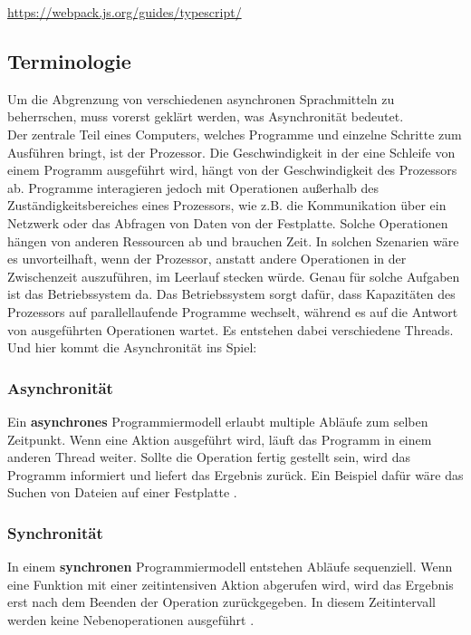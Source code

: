 \begin{center}
\url{https://webpack.js.org/guides/typescript/} 
\end{center}

\subsection{Terminologie}

Um die Abgrenzung von verschiedenen asynchronen Sprachmitteln zu beherrschen, muss vorerst geklärt werden, was Asynchronität bedeutet.\\

\noindent
Der zentrale Teil eines Computers, welches Programme und einzelne Schritte zum Ausführen bringt, ist der Prozessor. Die Geschwindigkeit in der eine Schleife von einem Programm ausgeführt wird, hängt von der Geschwindigkeit des Prozessors ab. Programme interagieren jedoch mit Operationen außerhalb des Zuständigkeitsbereiches eines Prozessors, wie z.B. die Kommunikation über ein Netzwerk oder das Abfragen von Daten von der Festplatte. Solche Operationen hängen von anderen Ressourcen ab und brauchen Zeit. In solchen Szenarien wäre es unvorteilhaft, wenn der Prozessor, anstatt andere Operationen in der Zwischenzeit auszuführen, im Leerlauf stecken würde. Genau für solche Aufgaben ist das Betriebssystem da. Das Betriebssystem sorgt dafür, dass Kapazitäten des Prozessors auf parallellaufende Programme wechselt, während es auf die Antwort von ausgeführten Operationen wartet. Es entstehen dabei verschiedene \glqq Threads\grqq{}. Und hier kommt die Asynchronität ins Spiel:

\subsubsection{Asynchronität}

Ein \textbf{asynchrones} Programmiermodell erlaubt multiple Abläufe zum selben Zeitpunkt. Wenn eine Aktion ausgeführt wird, läuft das Programm in einem anderen \glqq Thread\grqq{} weiter. Sollte die Operation fertig gestellt sein, wird das Programm informiert und liefert das Ergebnis zurück. Ein Beispiel dafür wäre das Suchen von Dateien auf einer Festplatte \cite{asynchronitaet}.

\subsubsection{Synchronität}

In einem \textbf{synchronen} Programmiermodell entstehen Abläufe sequenziell. Wenn eine Funktion mit einer zeitintensiven Aktion abgerufen wird, wird das Ergebnis erst nach dem Beenden der Operation zurückgegeben. In diesem Zeitintervall werden keine Nebenoperationen ausgeführt \cite{asynchronitaet}.\\

